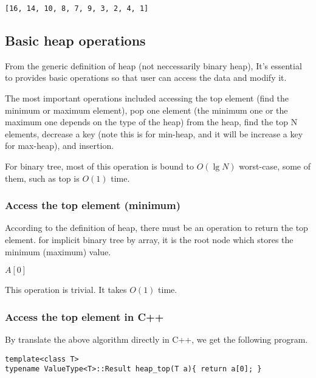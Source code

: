 \documentclass{article}
\begin{document}
\begin{verbatim}
[16, 14, 10, 8, 7, 9, 3, 2, 4, 1]
\end{verbatim}

\subsection{Basic heap operations}

From the generic definition of heap (not neccessarily binary heap),
It's essential to provides basic operations so that user can access
the data and modify it.

The most important operations included accessing the top element 
(find the minimum or maximum element), pop one element (the minimum
one or the maximum one depends on the type of the heap)
from the heap, find the top N elements, decrease a key (note this 
is for min-heap, and it will be increase a key for max-heap), and
insertion.

For binary tree, most of this operation is bound to $O(\lg{N})$ worst-case,
some of them, such as top is $O(1)$ time.

\subsubsection{Access the top element (minimum)}
According to the definition of heap, there must be an operation to
return the top element. for implicit binary tree by array, it is the
root node which stores the minimum (maximum) value.

\begin{algorithmic}[1]
  \State \Return $A[0]$
\EndFunction
\end{algorithmic}

This operation is trivial. It takes $O(1)$ time.

\subsubsection*{Access the top element in C++}

By translate the above algorithm directly in C++, we get the 
following program.

\lstset{language=C++}
\begin{lstlisting}
template<class T>
typename ValueType<T>::Result heap_top(T a){ return a[0]; }
\end{lstlisting}
\end{document}
